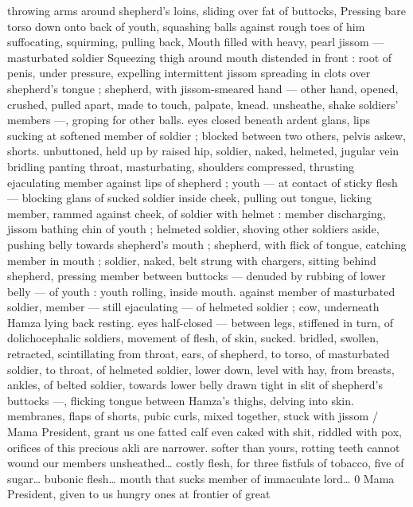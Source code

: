 throwing arms around shepherd's loins, sliding over fat of buttocks, 
Pressing bare torso down onto back of youth, squashing balls 
against rough toes of him suffocating, squirming, pulling back, 
Mouth filled with heavy, pearl jissom --- masturbated soldier 
Squeezing thigh around mouth distended in front : root of penis, 
under pressure, expelling intermittent jissom spreading in clots over 
shepherd's tongue ; shepherd, with jissom-smeared hand --- other 
hand, opened, crushed, pulled apart, made to touch, palpate, knead. 
unsheathe, shake soldiers' members ---, groping for other balls. 
eyes closed beneath ardent glans, lips sucking at softened member 
of soldier ; blocked between two others, pelvis askew, shorts. 
unbuttoned, held up by raised hip, soldier, naked, helmeted, jugular 
vein bridling panting throat, masturbating, shoulders compressed, 
thrusting ejaculating member against lips of shepherd ; youth --- at 
contact of sticky flesh --- blocking glans of sucked soldier inside 
cheek, pulling out tongue, licking member, rammed against cheek, of 
soldier with helmet : member discharging, jissom bathing chin of 
youth ; helmeted soldier, shoving other soldiers aside, pushing belly 
towards shepherd's mouth ; shepherd, with flick of tongue, catching 
member in mouth ; soldier, naked, belt strung with chargers, sitting 
behind shepherd, pressing member between buttocks --- denuded 
by rubbing of lower belly --- of youth : youth rolling, inside mouth. 
against member of masturbated soldier, member --- still ejaculating 
--- of helmeted soldier ; cow, underneath Hamza lying back resting. 
eyes half-closed --- between legs, stiffened in turn, of 
dolichocephalic soldiers, movement of flesh, of skin, sucked. 
bridled, swollen, retracted, scintillating from throat, ears, of 
shepherd, to torso, of masturbated soldier, to throat, of helmeted 
soldier, lower down, level with hay, from breasts, ankles, of belted 
soldier, towards lower belly drawn tight in slit of shepherd's buttocks 
---, flicking tongue between Hamza's thighs, delving into skin. 
membranes, flaps of shorts, pubic curls, mixed together, stuck with 
jissom {\slash} {\td} {\gl} Mama President, grant us one fatted calf{\td} even caked 
with shit, riddled with pox, orifices of this precious akli are narrower. 
softer than yours, rotting teeth cannot wound our members 
unsheathed{\ldots} costly flesh, for three fistfuls of tobacco, five of 
sugar{\ldots} bubonic flesh{\ldots} mouth that sucks member of immaculate 
lord{\ldots} 0 Mama President, given to us hungry ones at frontier of great 

